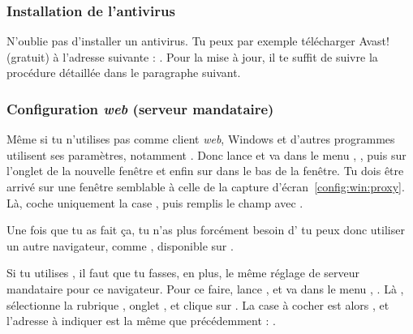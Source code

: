


\subsubsection{Installation de l'antivirus}
\label{antivirus} 

N'oublie pas d'installer un antivirus. Tu peux par exemple télécharger Avast! (gratuit) à l'adresse suivante : . Pour la mise à jour, il te suffit de suivre la procédure détaillée dans le paragraphe suivant.

\subsubsection{Configuration \emph{web} (serveur mandataire)}


M\^eme si tu n'utilises pas  comme client \emph{web}, Windows et d'autres programmes
utilisent ses param\`etres, notamment . Donc lance  et va
dans le menu , , puis sur l'onglet  de la
nouvelle fen\^etre et enfin sur  dans le bas de la fen\^etre. Tu dois \^etre arriv\'e sur une fen\^etre semblable \`a celle de la capture d'\'ecran~\ref{config:win:proxy}. L\`a, coche
uniquement la case , puis remplis le champ
 avec .

Une fois que tu as fait \c{c}a, tu n'as plus forc\'ement besoin d' tu peux donc utiliser un autre navigateur, comme , disponible sur .



Si tu utilises , il faut que tu fasses, en plus, le m\^eme r\'eglage de serveur mandataire pour
ce navigateur. Pour ce faire, lance , et va dans le menu ,
. L\`a , s\'electionne la rubrique , onglet , et clique sur
. La case \`a  cocher est alors ,
et l'adresse \`a  indiquer est la m\^eme que pr\'ec\'edemment : .


